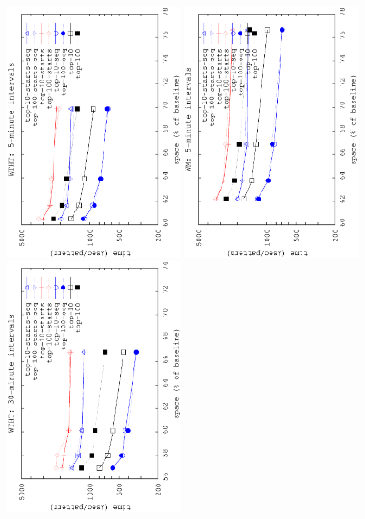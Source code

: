 \begin{figure}[!ht]
	\begin{center}

		{\includegraphics[angle=-90,width=0.45\textwidth]{figures_synt/madrid_st_topk_ht_5.eps}}
		{\includegraphics[angle=-90,width=0.45\textwidth]{figures_synt/madrid_st_topk_wm_5.eps}}
		{\includegraphics[angle=-90,width=0.45\textwidth]{figures_synt/madrid_st_topk_ht_30.eps}}

\end{center}
\end{figure}
